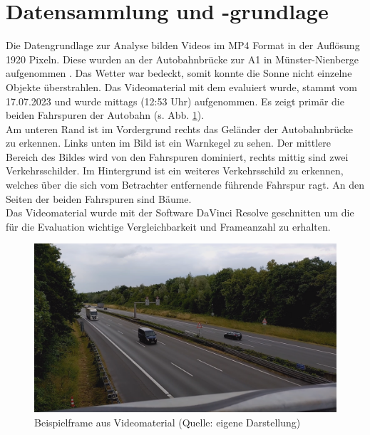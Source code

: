 \section{Datensammlung und -grundlage}
{ \label{sec:datengrundlage}
	Die Datengrundlage zur Analyse bilden Videos im MP4 Format in der Auflösung 1920  Pixeln. Diese wurden an der Autobahnbrücke zur A1 in Münster-Nienberge aufgenommen \citep{GMaps}. Das Wetter war bedeckt, somit konnte die Sonne nicht einzelne Objekte überstrahlen. Das Videomaterial mit dem evaluiert wurde, stammt vom 17.07.2023 und wurde mittags (12:53 Uhr) aufgenommen. Es zeigt primär die beiden Fahrspuren der Autobahn (s. Abb. \ref{Bsp_Evaluations_Vidmat}). \\
	Am unteren Rand ist im Vordergrund rechts das Geländer der Autobahnbrücke zu erkennen. Links unten im Bild ist ein Warnkegel zu sehen. Der mittlere Bereich des Bildes wird von den Fahrspuren dominiert, rechts mittig sind zwei Verkehrsschilder. Im Hintergrund ist ein weiteres Verkehrsschild zu erkennen, welches über die sich vom Betrachter entfernende führende Fahrspur ragt. An den Seiten der beiden Fahrspuren sind Bäume. \\
	Das Videomaterial wurde mit der Software DaVinci Resolve \citep{davinciresolve} geschnitten um die für die Evaluation wichtige Vergleichbarkeit und Frameanzahl zu erhalten.
	\begin{figure}[ht]
		\centering
		\includegraphics*[scale = 0.35, keepaspectratio ]{images/Evaluation/Screenshot_Video_A10s.png}
		\caption[Beispielframe aus Videomaterial]{Beispielframe aus Videomaterial (Quelle: eigene Darstellung)} 
		\label{Bsp_Evaluations_Vidmat}
 \end{figure}
}



